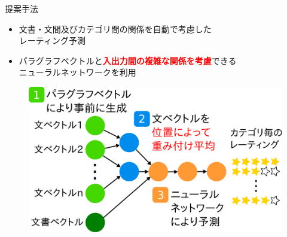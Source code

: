 \documentclass[aspectratio=43,unicode,10pt]{beamer}
\newcommand{\fire}[1]{\textcolor{red}{\textbf{#1}}}
\begin{document}
\begin{frame}{提案手法}{}
  \begin{itemize}
    \item 文書・文間及びカテゴリ間の関係を自動で考慮した\\レーティング予測
    \item パラグラフベクトルと\fire{入出力間の複雑な関係を考慮}できる \\
          ニューラルネットワークを利用
  \end{itemize}
  \begin{figure}
    \includegraphics[width=0.8\linewidth]
                    {fig/model_with_detailed_processes.pdf}
  \end{figure}
\end{frame}
\end{document}
